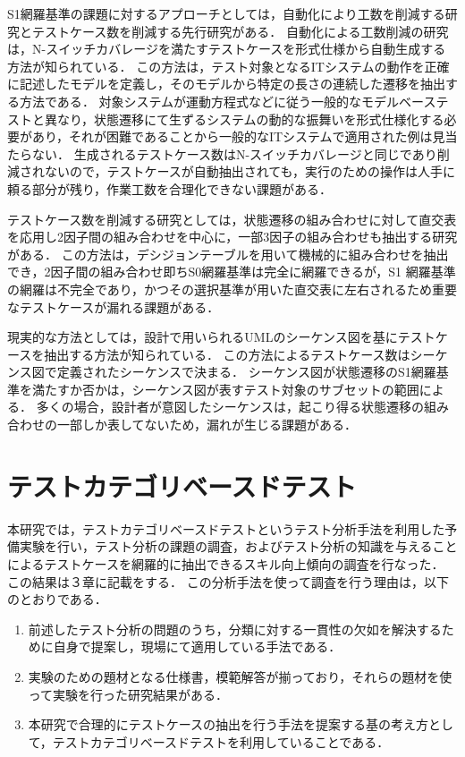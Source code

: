 S1網羅基準の課題に対するアプローチとしては，自動化により工数を削減する研究とテストケース数を削減する先行研究がある．
自動化による工数削減の研究は，N-スイッチカバレージを満たすテストケースを形式仕様から自動生成する方法が知られている．
この方法は，テスト対象となるITシステムの動作を正確に記述したモデルを定義し，そのモデルから特定の長さの連続した遷移を抽出する方法である\cite{takagi2010concurrent}．
対象システムが運動方程式などに従う一般的なモデルベーステストと異なり，状態遷移にて生ずるシステムの動的な振舞いを形式仕様化する必要があり，それが困難であることから一般的なITシステムで適用された例は見当たらない．
生成されるテストケース数はN-スイッチカバレージと同じであり削減されないので，テストケースが自動抽出されても，実行のための操作は人手に頼る部分が残り，作業工数を合理化できない課題がある．

テストケース数を削減する研究としては，状態遷移の組み合わせに対して直交表を応用し2因子間の組み合わせを中心に，一部3因子の組み合わせも抽出する研究がある\cite{akiyama2007}\cite{akiyama2012}．
この方法は，デシジョンテーブルを用いて機械的に組み合わせを抽出でき，2因子間の組み合わせ即ちS0網羅基準は完全に網羅できるが，S1 網羅基準の網羅は不完全であり，かつその選択基準が用いた直交表に左右されるため重要なテストケースが漏れる課題がある．

現実的な方法としては，設計で用いられるUMLのシーケンス図を基にテストケースを抽出する方法が知られている\cite{hartmann2000uml}．
この方法によるテストケース数はシーケンス図で定義されたシーケンスで決まる．
シーケンス図が状態遷移のS1網羅基準を満たすか否かは，シーケンス図が表すテスト対象のサブセットの範囲による．
多くの場合，設計者が意図したシーケンスは，起こり得る状態遷移の組み合わせの一部しか表してないため，漏れが生じる課題がある．



\newpage
\section{テストカテゴリベースドテスト}
本研究では，テストカテゴリベースドテスト\cite{yumoto2013test}というテスト分析手法を利用した予備実験を行い，テスト分析の課題の調査，およびテスト分析の知識を与えることによるテストケースを網羅的に抽出できるスキル向上傾向の調査を行なった．
この結果は３章に記載をする．
この分析手法を使って調査を行う理由は，以下のとおりである．
\begin{enumerate}
\item 前述したテスト分析の問題のうち，分類に対する一貫性の欠如を解決するために自身で提案し，現場にて適用している手法である．
\item 実験のための題材となる仕様書，模範解答が揃っており，それらの題材を使って実験を行った研究結果がある．
\item 本研究で合理的にテストケースの抽出を行う手法を提案する基の考え方として，テストカテゴリベースドテストを利用していることである．
\end{enumerate}

